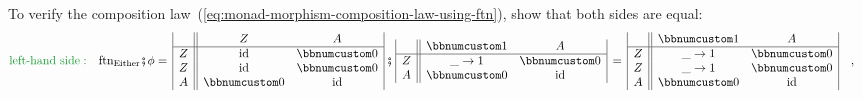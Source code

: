 To verify the composition law~(\ref{eq:monad-morphism-composition-law-using-ftn}),
show that both sides are equal:
\begin{align*}
{\color{greenunder}\text{left-hand side}:}\quad & \text{ftn}_{\text{Either}}\bef\phi=\,\begin{array}{|c||cc|}
 & Z & A\\
\hline Z & \text{id} & \bbnum 0\\
Z & \text{id} & \bbnum 0\\
A & \bbnum 0 & \text{id}
\end{array}\,\bef\,\begin{array}{|c||cc|}
 & \bbnum 1 & A\\
\hline Z & \_\rightarrow1 & \bbnum 0\\
A & \bbnum 0 & \text{id}
\end{array}\,=\,\begin{array}{|c||cc|}
 & \bbnum 1 & A\\
\hline Z & \_\rightarrow1 & \bbnum 0\\
Z & \_\rightarrow1 & \bbnum 0\\
A & \bbnum 0 & \text{id}
\end{array}\quad,
\end{align*}
